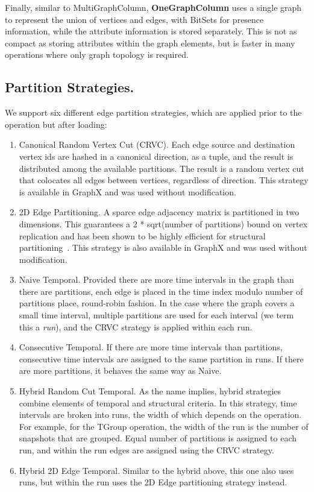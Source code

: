 Finally, similar to MultiGraphColumn, {\bf OneGraphColumn} uses a single
graph to represent the union of vertices and edges, with BitSets for
presence information, while the attribute information is stored
separately.  This is not as compact as storing attributes within the
graph elements, but is faster in many operations where only graph
topology is required.

\subsection{Partition Strategies.}  

We support six different edge partition strategies, which are
applied prior to the operation but after loading:
\begin{enumerate}
\item Canonical Random Vertex Cut (CRVC).  Each edge source and destination
  vertex ids are hashed in a canonical direction, as a tuple, and the
  result is distributed among the available partitions.  The result is
  a random vertex cut that colocates all edges between vertices,
  regardless of direction.  This strategy is available in GraphX and
  was used without modification.
\item 2D Edge Partitioning.  A sparce edge adjacency matrix is
  partitioned in two dimensions.  This guarantees a 2 * sqrt(number of
  partitions) bound on vertex replication and has been shown to be
  highly efficient for structural partitioning~\cite{}.  This strategy
  is also available in GraphX and was used without modification.
\item Naive Temporal.  Provided there are more time intervals in the
  graph than there are partitions, each edge is placed in the time
  index modulo number of partitions place, round-robin fashion.  In
  the case where the graph covers a small time interval, multiple
  partitions are used for each interval (we term this a {\em run}),
  and the CRVC strategy is applied within each run.
\item Consecutive Temporal.  If there are more time intervals than
  partitions, consecutive time intervals are assigned to the same
  partition in runs.  If there are more partitions, it behaves the
  same way as Naive.
\item Hybrid Random Cut Temporal.  As the name implies, hybrid
  strategies combine elements of temporal and structural criteria.  In
  this strategy, time intervals are broken into runs, the width of
  which depends on the operation.  For example, for the TGroup
  operation, the width of the run is the number of snapshots that are
  grouped.  Equal number of partitions is assigned to each run, and
  within the run edges are assigned using the CRVC strategy.
\item Hybrid 2D Edge Temporal.  Similar to the hybrid above, this one
  also uses runs, but within the run uses the 2D Edge partitioning
  strategy instead.
\end{enumerate}

